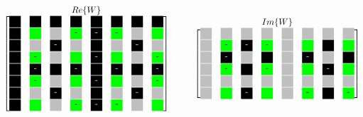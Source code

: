 \begin{frame}
\begin{center}
\begin{minipage}{0.9\textwidth}
\begin{center}
  \[
   \stackrel{\mbox{$Re\{W\}$}}{
    \begin{bmatrix}
     \myboxOnePos 	& \myboxOnePos 		& \myboxOnePos 	& \myboxOnePos 		& \myboxOnePos 	& \myboxOnePos 		& \myboxOnePos 	& \myboxOnePos \\
     \myboxOnePos 	& \myboxSqrtPos 	& \myboxZero 	& \myboxSqrtNeg		& \myboxOneNeg	& \myboxSqrtNeg		& \myboxZero	& \myboxSqrtPos \\
     \myboxOnePos 	& \myboxZero 		& \myboxOneNeg 	& \myboxZero 		& \myboxOnePos 	& \myboxZero 		& \myboxOneNeg 	& \myboxZero \\
     \myboxOnePos 	& \myboxSqrtNeg 	& \myboxZero 	& \myboxSqrtPos 	& \myboxOneNeg 	& \myboxSqrtPos 	& \myboxZero 	& \myboxSqrtNeg \\
     \myboxOnePos 	& \myboxOneNeg 		& \myboxOnePos 	& \myboxOneNeg 		& \myboxOnePos 	& \myboxOneNeg 		& \myboxOnePos 	& \myboxOneNeg \\
     \myboxOnePos 	& \myboxSqrtNeg 	& \myboxZero 	& \myboxSqrtPos 	& \myboxOneNeg 	& \myboxSqrtPos 	& \myboxZero 	& \myboxSqrtNeg \\
     \myboxOnePos 	& \myboxZero 		& \myboxOneNeg 	& \myboxZero 		& \myboxOnePos 	& \myboxZero 		& \myboxOneNeg 	& \myboxZero \\
     \myboxOnePos 	& \myboxSqrtPos 	& \myboxZero 	& \myboxSqrtNeg		& \myboxOneNeg	& \myboxSqrtNeg		& \myboxZero	& \myboxSqrtPos 
    \end{bmatrix}
   }
   \hspace{1cm}
   \stackrel{\mbox{$Im\{W\}$}}{
    \begin{bmatrix}
     \myboxZero 	& \myboxZero 		& \myboxZero 	& \myboxZero 		& \myboxZero 	& \myboxZero 		& \myboxZero 	& \myboxZero \\
     \myboxZero 	& \myboxSqrtNeg 	& \myboxOneNeg 	& \myboxSqrtNeg		& \myboxZero	& \myboxSqrtPos		& \myboxOnePos	& \myboxSqrtPos \\
     \myboxZero 	& \myboxOneNeg 		& \myboxZero 	& \myboxOnePos 		& \myboxZero 	& \myboxOneNeg 		& \myboxZero 	& \myboxOnePos \\
     \myboxZero 	& \myboxSqrtNeg 	& \myboxOnePos 	& \myboxSqrtNeg 	& \myboxZero 	& \myboxSqrtPos 	& \myboxOneNeg 	& \myboxSqrtPos \\
     \myboxZero 	& \myboxZero 		& \myboxZero 	& \myboxZero 		& \myboxZero 	& \myboxZero 		& \myboxZero 	& \myboxZero \\
     \myboxZero 	& \myboxSqrtPos 	& \myboxOneNeg 	& \myboxSqrtPos		& \myboxZero 	& \myboxSqrtNeg 	& \myboxOnePos 	& \myboxSqrtNeg \\

\end{bmatrix}}\]
\end{center}
\end{minipage}
\end{center}
\end{frame}
